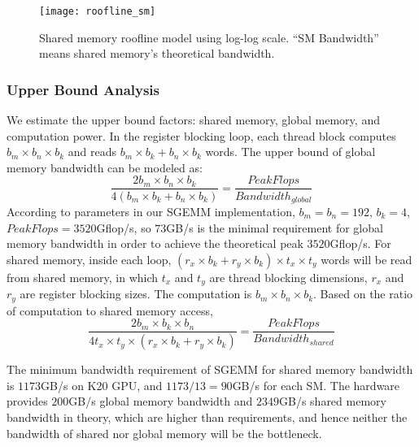 \begin{figure}[htbp]
\begin{center}
\texttt{[image: roofline\_sm]}
    \caption{Shared memory roofline model using log-log scale. ``SM Bandwidth'' means shared memory's theoretical
    bandwidth. }%
\label{fig:roofline_shared}
\end{center}
\end{figure}


\subsubsection{Upper Bound Analysis}

We estimate the upper bound factors: 
shared memory, global memory, and computation power. In the register blocking loop, each thread block computes $b_m \times b_n \times b_k$ and reads $b_m \times b_k+b_n \times b_k$ words. The upper bound of global memory bandwidth can be modeled as:
\begin{equation}
    \frac{2 b_m \times b_n \times b_k}{4 (b_m \times b_k + b_n \times b_k)} = \frac{PeakFlops}{Bandwidth_{global}}
    \label{equ:global}
\end{equation}
According to parameters in our SGEMM implementation, $b_m=b_n=192$, $b_k=4$, $PeakFlops=3520$Gflop/s, so $73$GB/s is the minimal
requirement for global memory bandwidth in order to achieve the theoretical peak $3520$Gflop/s.
For shared memory, inside each loop, $(r_x \times b_k + r_y \times b_k) \times t_x \times t_y$ words will be read from shared memory, in which $t_x$ and
$t_y$ are thread blocking dimensions, $r_x$ and $r_y$ are register blocking sizes. The computation is $b_m \times b_n \times b_k$. Based on the ratio of computation to shared memory access,
\begin{equation}
    \frac{2 b_m \times b_k \times b_n}{4 t_x \times t_y \times (r_x \times b_k + r_y  \times b_k)}  = \frac{PeakFlops}{Bandwidth_{shared}}
    \label{equ:shared}
\end{equation}


The minimum bandwidth requirement of SGEMM for shared memory bandwidth is
$1173$GB/s on K20 GPU, and $1173/13=90$GB/s for each SM. The hardware provides
$200$GB/s global memory bandwidth and $2349$GB/s shared memory bandwidth in
theory, which are higher than requirements, and hence neither the bandwidth of
shared nor global memory will be the bottleneck.

